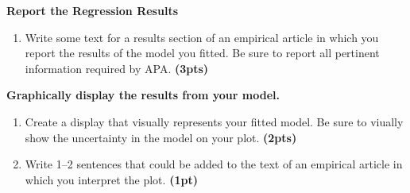 \documentclass[]{article}
\begin{document}
\pagebreak

\noindent\textbf{Report the Regression Results}

\begin{enumerate}[resume]
\item Write some text for a results section of an empirical article in which you report the results of the model you fitted. Be sure to report all pertinent information required by APA. \textbf{(3pts)} 
\end{enumerate}

\vspace{\baselineskip}
\noindent\textbf{Graphically display the results from your model.}

\begin{enumerate}[resume]
\item Create a display that visually represents your fitted model. Be sure to viually show the uncertainty in the model on your plot. \textbf{(2pts)}
\item Write 1--2 sentences that could be added to the text of an empirical article in which you interpret the plot. \textbf{(1pt)}
\end{enumerate}
\end{document}
